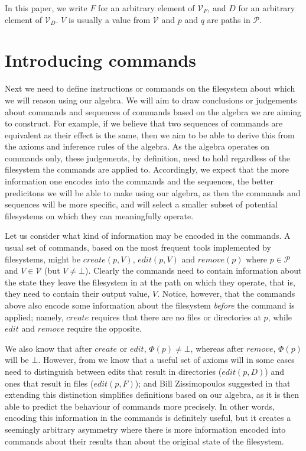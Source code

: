 \documentclass[12pt]{article}
\newcommand{\setv}{\mathcal{V}}
\newcommand{\setvx}[1]{\mathcal{V}_{#1}}
\newcommand{\setf}{\setvx{F}}
\newcommand{\setd}{\setvx{D}}
\newcommand{\setp}{\mathcal{P}}
\newcommand{\empt}{\bot}
\newcommand{\FS}{\Phi} %
\theoremstyle{definition}
\begin{document}


In this paper, we write $F$ for an arbitrary element of $\setf$, and $D$ for an arbitrary element
of $\setd$. $V$ is usually a value from $\setv$ and $p$ and $q$ are paths in $\setp$.

\section{Introducing commands}

Next we need to define instructions or commands on the filesystem about which we will reason
using our algebra.
We will aim to draw conclusions or judgements about commands and sequences of commands
based on the algebra we are aiming to construct.
For example, if we believe that two sequences of commands are equivalent as their effect
is the same, then we aim to be able to derive this from the axioms and inference rules of the
algebra.
As the algebra operates on commands only,
these judgements, by definition, need to hold regardless of the filesystem the commands are applied to.
Accordingly, we expect that the more information one encodes into the commands and the sequences,
the better predicitons we will be able to make using our algebra,
as then the commands and sequences will be more specific, and will select a smaller subset
of potential filesystems on which they can meaningfully operate.

Let us consider what kind of information may be encoded in the commands.
A usual set of commands, based on the most frequent tools implemented by filesystems,
might be $create(p,V)$, $edit(p,V)$ and $remove(p)$ where $p\in\setp$ and $V\in\setv$ (but $V\neq\empt$).
Clearly the commands need to contain information about the state they leave the filesystem
in at the path on which they operate, that is, they need to contain their output value, $V$.
Notice, however, that the commands above also encode some information about the filesystem
\emph{before} the command is applied; namely, $create$ requires that there are no files
or directories at $p$, while $edit$ and $remove$ require the opposite.

We also know that after $create$ or $edit$, $\FS(p)\neq\empt$, whereas after $remove$,
$\FS(p)$ will be $\empt$. However, from \cite{NREC:alg} we know that a useful set of axioms
will in some cases need to distinguish between edits that result in directories ($edit(p,D)$) and
ones that result in files ($edit(p,F)$);
and Bill Zissimopoulos suggested in \cite{BZ} that extending this distinction simplifies
definitions based on our algebra, as it is then able to predict the behaviour of commands
more precisely. 
In other words, encoding this information in the commands is definitely useful,
but it creates a seemingly arbitrary asymmetry where
there is more information encoded into commands about their results than about the
original state of the filesystem.
\end{document}
